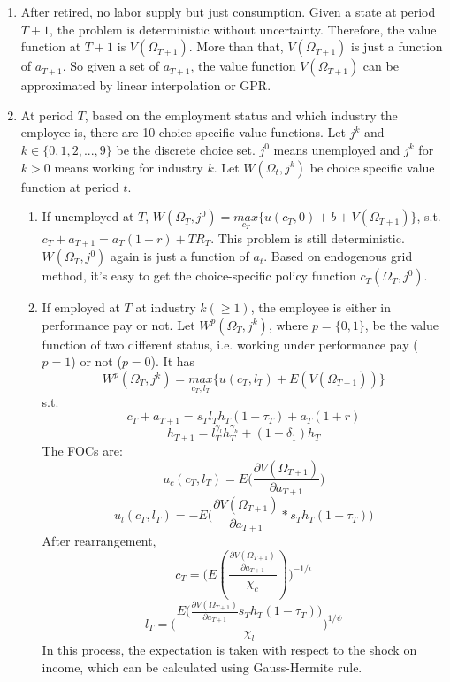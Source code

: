 \documentclass{article}
\begin{document}
		\begin{enumerate}[{}1{).}]
			\item After retired, no labor supply but just consumption. Given a state at period $T+1$, the problem is deterministic without uncertainty. Therefore, the value function at $T+1$ is $V(\Omega_{T+1})$. More than that, $V(\Omega_{T+1})$ is just a function of $a_{T+1}$. So given a set of $a_{T+1}$, the value function $V(\Omega_{T+1})$ can be approximated by linear interpolation or GPR.
			
			\item At period $T$, based on the employment status and which industry the employee is, there are 10 choice-specific value functions. Let $j^k$ and $ k \in \{0, 1, 2, ..., 9\}$ be the discrete choice set. $j^0$ means unemployed and $j^k$ for $k>0$ means working for industry $k$. Let $W(\Omega_t, j^k)$ be choice specific value function at period $t$.
				
				\begin{enumerate} [{}a{).}]
					\item If unemployed at $T$, $W(\Omega_{T}, j^0) = \underset{c_T}{max} \{u(c_T, 0) + b + V(\Omega_{T+1})\}$, s.t. $c_T + a_{T+1} = a_T (1+r) +TR_T$. This problem is still deterministic. $W(\Omega_{T}, j^0)$ again is just a function of $a_t$. Based on endogenous grid method, it's easy to get the choice-specific policy function $c_T (\Omega_T, j^0) $.
					
					\item If employed at $T$ at industry $k (\geq 1)$, the employee is either in performance pay or not. Let $W^p(\Omega_{T}, j^k) $, where $p = \{0, 1\}$, be the value function of two different status, i.e. working under performance pay ($p=1$) or not ($p=0$).  It has 
						$$ W^p(\Omega_{T}, j^k) = \underset{c_T, l_T}{max} \Big\{u(c_T, l_T) + E(V(\Omega_{T+1}))\Big\} $$
					s.t.
						$$c_T + a_{T+1} = s_T l_T h_T (1 - \tau_T) + a_T(1+r) $$
						$$ h_{T+1} = l_T^{\gamma_l} h_T^{\gamma_h} + (1 - \delta_1)h_T$$
					The FOCs are:
						$$u_c(c_T, l_T) = E\Big(\frac{ \partial V(\Omega_{T+1})}{\partial a_{T+1}}\Big)$$
						$$u_l(c_T, l_T) = -E\Big(\frac{ \partial V(\Omega_{T+1})}{\partial a_{T+1}} * s_T h_T (1-\tau_T)\Big)$$
					After rearrangement, 
							$$c_T = \Big(E(\frac{\frac{ \partial V(\Omega_{T+1})}{\partial a_{T+1}}}{\chi_c})\Big)^{-1/\iota}$$
							$$l_T = \Big(\frac{E\big(\frac{ \partial V(\Omega_{T+1})}{\partial a_{T+1}} s_T h_T (1-\tau_T) \big)}{\chi_l}\Big)^{1/\psi}$$
					In this process, the expectation is taken with respect to the shock on income, which can be calculated using Gauss-Hermite rule. \par
					

\end{enumerate}
\end{enumerate}
\end{document}

